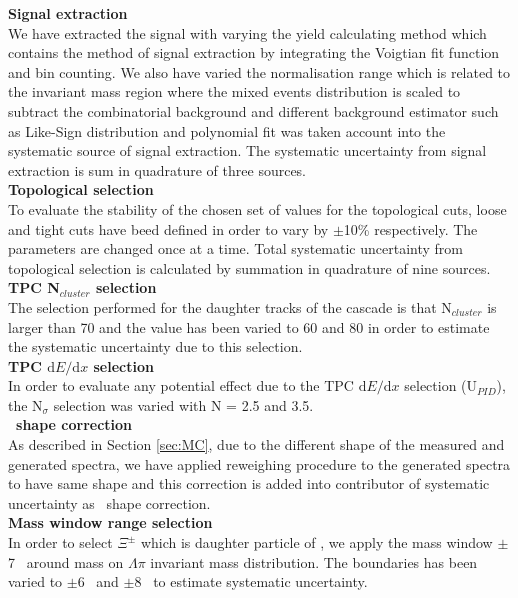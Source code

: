 \textbf{Signal extraction}\\
We have extracted the signal with varying the yield calculating method which contains the method of signal extraction by integrating the Voigtian fit function and bin counting. We also have varied the normalisation range which is related to the invariant mass region where the mixed events distribution is scaled to subtract the combinatorial background and different background estimator such as Like-Sign distribution and polynomial fit was taken account into the systematic source of signal extraction. The systematic uncertainty from signal extraction is sum in quadrature of three sources. \\


\textbf{Topological selection}\\
To evaluate the stability of the chosen set of values for the topological cuts, loose and tight cuts have beed defined in order to vary by $\pm$10\% respectively. The parameters are changed once at a time. Total systematic uncertainty from topological selection is calculated by summation in quadrature of nine sources.\\


\textbf{TPC N$_{cluster}$ selection}\\
The selection performed for the daughter tracks of the cascade is that N$_{cluster}$ is larger than 70 and the value has been varied to 60 and 80 in order to estimate the systematic uncertainty  due to this selection. \\


\textbf{TPC $\mathrm{d}E/\mathrm{d}x$ selection}\\
In order to evaluate any potential effect due to the TPC $\mathrm{d}E/\mathrm{d}x$ selection (U$_{PID}$), the N$_{\sigma}$ selection was varied with N = 2.5 and 3.5. \\


\textbf{\pt~shape correction}\\
As described in Section \ref{sec:MC}, due to the different shape of the measured and generated \xis spectra, we have applied reweighing procedure to the generated spectra to have same shape and this correction is added into contributor of systematic uncertainty as \pt~shape correction.\\

\textbf{Mass window range selection}\\
In order to select $\Xi^{\pm}$ which is daughter particle of \xis, we apply the mass window $\pm$7 \mmass~around \xis mass on $\Lambda$$\pi$ invariant mass distribution. The boundaries has been varied to $\pm$6 \mmass~and $\pm$8 \mmass~to estimate systematic uncertainty.\\
 

